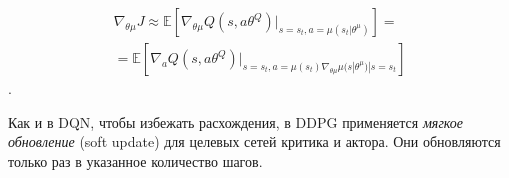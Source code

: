 \begin{equation}
	\label{eq:ch1-ddpg-4}
	\begin{multlined}
		\nabla_{\theta \mu} J \approx \mathbb{E}[\nabla_{\theta \mu} Q(s, a \theta^Q)|_{s=s_t,a=\mu(s_t|\theta^\mu)}] = \\
		= \mathbb{E}[\nabla_a Q(s, a \theta^Q)|_{s=s_t,a=\mu(s_t) \nabla_{\theta \mu} \mu (s|\theta^\mu)|s=s_t}]
	\end{multlined}
\end{equation}.

Как и в DQN, чтобы избежать расхождения, в DDPG применяется \textit{мягкое обновление} (soft update) для целевых сетей критика и актора. Они обновляются только раз в указанное количество шагов.
